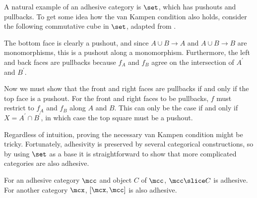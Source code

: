 \begin{example}
    A natural example of an adhesive category is \(\set\), which has pushouts
    and pullbacks.
    To get some idea how the van Kampen condition also holds, consider the
    following commutative cube in \(\set\), adapted from
    \cite[Sec. 4.3]{kissinger2012pictures}.
    \begin{center}
    \end{center}
    The bottom face is clearly a pushout, and since \(A \cup B \to A\) and
    \(A \cup B \to B\) are monomorphisms, this is a pushout along a
    monomorphism.
    Furthermore, the left and back faces are pullbacks because \(f_A\) and
    \(f_B\) agree on the intersection of \(A^\prime\) and \(B^\prime\).

    Now we must show that the front and right faces are pullbacks if and only if
    the top face is a pushout.
    For the front and right faces to be pullbacks, \(f\) must restrict to
    \(f_A\) and \(f_B\) along \(A\) and \(B\).
    This can only be the case if and only if \(X = A^\prime \cap B^\prime\), in
    which case the top square must be a pushout.
\end{example}

Regardless of intuition, proving the necessary van Kampen condition might be
tricky.
Fortunately, adhesivity is preserved by several categorical constructions, so
by using \(\set\) as a base it is straightforward to show that more complicated
categories are also adhesive.

\begin{proposition}
    For an adhesive category \(\mcc\) and object \(C\) of \(\mcc\),
    \(\mcc \slice C\) is adhesive.
    For another category \(\mcx\), \([\mcx, \mcc]\) is also adhesive.
\end{proposition}

